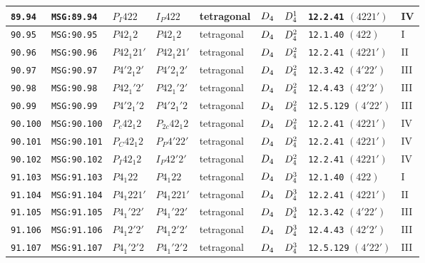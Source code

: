 \documentclass[fleqn,10pt]{jsarticle}
\begin{document}
\begin{center}
\begin{longtable}{lllllllll}
\texttt{89.94} & \texttt{MSG:89.94} & $P_{I}422$ & $I_{P}422$ & tetragonal & $D_{\rm 4}$ & $D_{\rm 4}^{1}$ & \texttt{12.2.41} $(4221')$ & IV \\ \hline
\texttt{90.95} & \texttt{MSG:90.95} & $P42_{1}2$ & $P42_{1}2$ & tetragonal & $D_{\rm 4}$ & $D_{\rm 4}^{2}$ & \texttt{12.1.40} $(422)$ & I \\
\texttt{90.96} & \texttt{MSG:90.96} & $P42_{1}21'$ & $P42_{1}21'$ & tetragonal & $D_{\rm 4}$ & $D_{\rm 4}^{2}$ & \texttt{12.2.41} $(4221')$ & II \\
\texttt{90.97} & \texttt{MSG:90.97} & $P4'2_{1}2'$ & $P4'2_{1}2'$ & tetragonal & $D_{\rm 4}$ & $D_{\rm 4}^{2}$ & \texttt{12.3.42} $(4'22')$ & III \\
\texttt{90.98} & \texttt{MSG:90.98} & $P42_{1}'2'$ & $P42_{1}'2'$ & tetragonal & $D_{\rm 4}$ & $D_{\rm 4}^{2}$ & \texttt{12.4.43} $(42'2')$ & III \\
\texttt{90.99} & \texttt{MSG:90.99} & $P4'2_{1}'2$ & $P4'2_{1}'2$ & tetragonal & $D_{\rm 4}$ & $D_{\rm 4}^{2}$ & \texttt{12.5.129} $(4'22')$ & III \\
\texttt{90.100} & \texttt{MSG:90.100} & $P_{c}42_{1}2$ & $P_{2c}42_{1}2$ & tetragonal & $D_{\rm 4}$ & $D_{\rm 4}^{2}$ & \texttt{12.2.41} $(4221')$ & IV \\
\texttt{90.101} & \texttt{MSG:90.101} & $P_{C}42_{1}2$ & $P_{P}4'22'$ & tetragonal & $D_{\rm 4}$ & $D_{\rm 4}^{2}$ & \texttt{12.2.41} $(4221')$ & IV \\
\texttt{90.102} & \texttt{MSG:90.102} & $P_{I}42_{1}2$ & $I_{P}42'2'$ & tetragonal & $D_{\rm 4}$ & $D_{\rm 4}^{2}$ & \texttt{12.2.41} $(4221')$ & IV \\ \hline
\texttt{91.103} & \texttt{MSG:91.103} & $P4_{1}22$ & $P4_{1}22$ & tetragonal & $D_{\rm 4}$ & $D_{\rm 4}^{3}$ & \texttt{12.1.40} $(422)$ & I \\
\texttt{91.104} & \texttt{MSG:91.104} & $P4_{1}221'$ & $P4_{1}221'$ & tetragonal & $D_{\rm 4}$ & $D_{\rm 4}^{3}$ & \texttt{12.2.41} $(4221')$ & II \\
\texttt{91.105} & \texttt{MSG:91.105} & $P4_{1}'22'$ & $P4_{1}'22'$ & tetragonal & $D_{\rm 4}$ & $D_{\rm 4}^{3}$ & \texttt{12.3.42} $(4'22')$ & III \\
\texttt{91.106} & \texttt{MSG:91.106} & $P4_{1}2'2'$ & $P4_{1}2'2'$ & tetragonal & $D_{\rm 4}$ & $D_{\rm 4}^{3}$ & \texttt{12.4.43} $(42'2')$ & III \\
\texttt{91.107} & \texttt{MSG:91.107} & $P4_{1}'2'2$ & $P4_{1}'2'2$ & tetragonal & $D_{\rm 4}$ & $D_{\rm 4}^{3}$ & \texttt{12.5.129} $(4'22')$ & III \\

\end{longtable}
\end{center}
\end{document}
